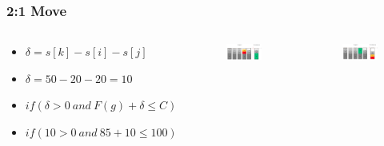 \documentclass{beamer}
\begin{document}
\begin{frame}
\frametitle{2:1 Move}
\begin{columns}[c] %
\begin{footnotesize}
\begin{itemize}
\item $\delta = s[k]-s[i]-s[j]$
\item $\delta = 50 - 20 - 20 = 10$
\item $if(\delta > 0 \ and \ F(g)+\delta \leq C)$
\item $if(10 > 0 \ and \ 85+10 \leq 100)$
\end{itemize}
\end{footnotesize}
\begin{figure}[!htbp]
\begin{center}
\includegraphics[scale=0.15]{img/Zwei_Eins_Move_1.png}
\end{center}
\label{fig:architecture}
\end{figure}
\begin{figure}[!htbp]
\begin{center}
\includegraphics[scale=0.15]{img/Zwei_Eins_Move_2.png}
\end{center}
\label{fig:architecture}
\end{figure}
\end{columns}
\end{frame}
\end{document}
